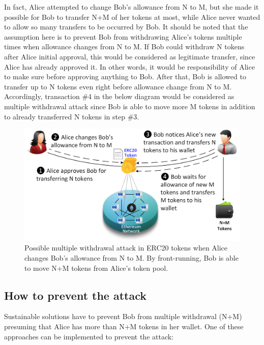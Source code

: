 In fact, Alice attempted to change Bob’s allowance from N to M, but she made it possible for Bob to transfer N+M of her tokens at most, while Alice never wanted to allow so many transfers to be occurred by Bob. It should be noted that the assumption here is to prevent Bob from withdrawing Alice’s tokens multiple times when allowance changes from N to M. If Bob could withdraw N tokens after Alice initial approval, this would be considered as legitimate transfer, since Alice has already approved it. In other words, it would be responsibility of Alice to make sure before approving anything to Bob. After that, Bob is allowed to transfer up to N tokens even right before allowance change from N to M. Accordingly, transaction \#4 in the below diagram would be considered as multiple withdrawal attack since Bob is able to move more M tokens in addition to already transferred N tokens in step \#3.
\begin{figure}[h]
	\includegraphics[width=1.0\linewidth]{figures/multiple_withdrawal_02.png}
	\caption{Possible multiple withdrawal attack in ERC20 tokens when Alice changes Bob's allowance from N to M. By front-running, Bob is able to move N+M tokens from Alice's token pool.}
\end{figure}

\subsection{How to prevent the attack}
Sustainable solutions have to prevent Bob from multiple withdrawal (N+M) presuming that Alice has more than N+M tokens in her wallet. One of these approaches can be implemented to prevent the attack:\newline

